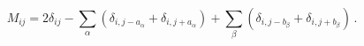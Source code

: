 \begin{equation}
M_{ij}= 2 \delta_{ij} - \sum_\alpha ( \delta_{i,j-a_\alpha}
+ \delta_{i,j+a_\alpha} ) + \sum_\beta ( \delta_{i,j-b_\beta}
+ \delta_{i,j+b_\beta} )  \, .
\label{polematrix}
\end{equation}

